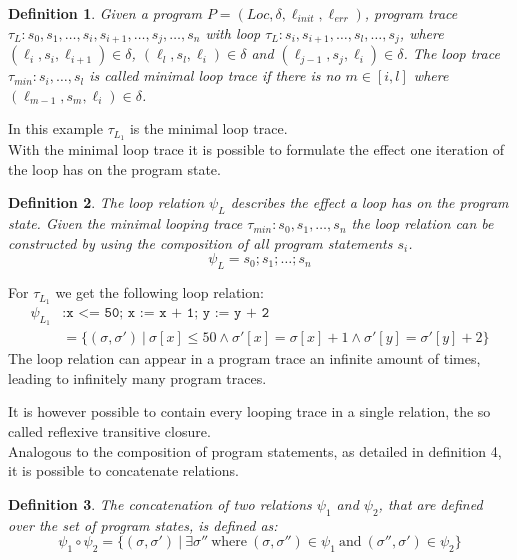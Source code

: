\documentclass{article}
\newcounter{example}[section]
\newtheorem{mydef}{Definition}
\newcommand\mycom[1]{}
\newcommand\mycom[1]{#1}
\newcommand{\ts}[1]{\mycom{\todo[color=green!40,inline]{\small TS: #1}}}
\begin{document}
\begin{mydef}
    Given a program $P = (Loc, \delta, \ell_{init}, \ell_{err})$, program trace \\ $\tau_L: s_0, s_1, \ldots, s_i, s_{i+1}, \ldots, s_j, \ldots, s_n$ with loop $\tau_L: s_i, s_{i+1}, \ldots, s_l, \ldots, s_j$, where $(\ell_i, s_i, \ell_{i+1}) \in \delta$, $(\ell_l, s_l, \ell_i) \in \delta$ and $(\ell_{j-1}, s_j, \ell_i) \in \delta$. The loop trace $\tau_{min}: s_i, \ldots, s_l$ is called minimal loop trace if there is no $m \in [i, l]$ where $(\ell_{m-1}, s_m, \ell_i) \in \delta$.
\end{mydef}
\ts{Complicated. I don't think you need a loop containing another loop for this definition.}

In this example $\tau_{L_1}$ is the minimal loop trace. \\

With the minimal loop trace it is possible to formulate the effect one iteration of the loop has on the program state.
\begin{mydef}
    The loop relation $\psi_L$ describes the effect a loop has on the program state.
    Given the minimal looping trace $\tau_{min}: s_0, s_1, \ldots, s_{n}$ the loop relation can be constructed by using the composition of all program statements $s_i$.
    \begin{equation*}
        \psi_L = s_0; s_1; \ldots; s_n
    \end{equation*}

\end{mydef}
For $\tau_{L_1}$ we get the following loop relation:
\begin{align*}
     \psi_{L_1}&:	\texttt{x <= 50; x := x + 1; y := y + 2} \ \\
     &= \{(\sigma, \sigma')\ |\ \sigma[x] \leq 50 \land \sigma'[x] = \sigma[x] + 1 \land \sigma'[y] = \sigma'[y] + 2 \}
\end{align*}
The loop relation can appear in a program trace an infinite amount of times, leading to infinitely many program traces.
\ts{How can a relation appear in a trace? You mean the sequence of statements forming the loop.}
It is however possible to contain every looping trace in a single relation, the so called reflexive transitive closure. \\


Analogous to the composition of program statements, as detailed in definition 4, it is possible to concatenate relations.\ts{Use labels to refer to definitions, sections,...}
\begin{mydef}
    The concatenation of two relations $\psi_1$ and $\psi_2$, that are defined over the set of program states, is defined as:
    \begin{equation*}
        \psi_1 \circ \psi_2 = \{(\sigma, \sigma')\ |\ \exists \sigma''\ \text{where}\ (\sigma, \sigma'') \in \psi_1\ \text{and}\ (\sigma'', \sigma') \in \psi_2 \}
    \end{equation*}
\end{mydef}
\end{document}
